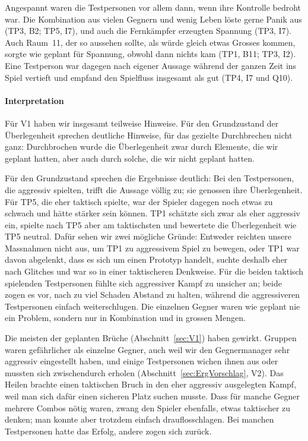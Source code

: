 \documentclass[../Main.tex]{subfiles}
\begin{document}
Angespannt waren die Testpersonen vor allem dann, wenn ihre Kontrolle bedroht war. Die Kombination aus vielen Gegnern und wenig Leben löste gerne Panik aus (TP3, B2; TP5, I7), und auch die Fernkämpfer erzeugten Spannung (TP3, I7). Auch Raum~11, der so aussehen sollte, als würde gleich etwas Grosses kommen, sorgte wie geplant für Spannung, obwohl dann nichts kam (TP1, B11; TP3, I2). Eine Testperson war dagegen nach eigener Aussage während der ganzen Zeit ins Spiel vertieft und empfand den Spielfluss insgesamt als gut (TP4, I7 und Q10).

\paragraph{Interpretation}
Für V1 haben wir insgesamt teilweise Hinweise. Für den Grundzustand der Überlegenheit sprechen deutliche Hinweise, für das gezielte Durchbrechen nicht ganz: Durchbrochen wurde die Überlegenheit zwar durch Elemente, die wir geplant hatten, aber auch durch solche, die wir nicht geplant hatten.

Für den Grundzustand sprechen die Ergebnisse deutlich: Bei den Testpersonen, die aggressiv spielten, trifft die Aussage völlig zu; sie genossen ihre Überlegenheit. Für TP5, die eher taktisch spielte, war der Spieler dagegen noch etwas zu schwach und hätte stärker sein können. TP1 schätzte sich zwar als eher aggressiv ein, spielte nach TP5 aber am taktischsten und bewertete die Überlegenheit wie TP5 neutral. Dafür sehen wir zwei mögliche Gründe: Entweder reichten unsere Massnahmen nicht aus, um TP1 zu aggressivem Spiel zu bewegen, oder TP1 war davon abgelenkt, dass es sich um einen Prototyp handelt, suchte deshalb eher nach Glitches und war so in einer taktischeren Denkweise. Für die beiden taktisch spielenden Testpersonen fühlte sich aggressiver Kampf zu unsicher an; beide zogen es vor, nach zu viel Schaden Abstand zu halten, während die aggressiveren Testpersonen einfach weiterschlugen. Die einzelnen Gegner waren wie geplant nie ein Problem, sondern nur in Kombination und in grossen Mengen.

Die meisten der geplanten Brüche (Abschnitt~\ref{sec:V1}) haben gewirkt. Gruppen waren gefährlicher als einzelne Gegner, auch weil wir den Gegnermanager sehr aggressiv eingestellt haben, und einige Testpersonen wichen ihnen aus oder mussten sich zwischendurch erholen (Abschnitt~\ref{sec:ErgVorschlag}, V2). Das Heilen brachte einen taktischen Bruch in den eher aggressiv ausgelegten Kampf, weil man sich dafür einen sicheren Platz suchen musste. Dass für manche Gegner mehrere Combos nötig waren, zwang den Spieler ebenfalls, etwas taktischer zu denken; man konnte aber trotzdem einfach drauflosschlagen. Bei manchen Testpersonen hatte das Erfolg, andere zogen sich zurück.
\end{document}
